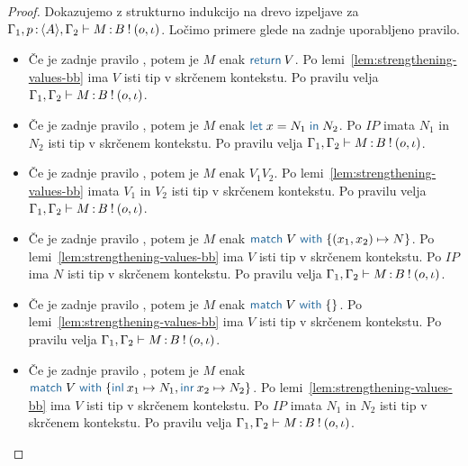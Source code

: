 \begin{proof}
	Dokazujemo z strukturno indukcijo na drevo izpeljave za $\Gamma_1, p \mathinner{:} \langle A \rangle, \Gamma_2 \vdash M \mathinner{:} B \mathbin{!} (o, \iota)$.
	Ločimo primere glede na zadnje uporabljeno pravilo.
	
	\begin{itemize}
		\item Če je zadnje pravilo , potem je $M$ enak $\tmreturn{V}$.
		Po lemi~\ref{lem:strengthening-values-bb} ima $V$ isti tip v skrčenem kontekstu.
		Po pravilu  velja $\Gamma_1, \Gamma_2 \vdash M \mathinner{:} B \mathbin{!} (o, \iota)$.
		
		\item Če je zadnje pravilo , potem je $M$ enak $\tmlet{x}{N_1}{N_2}$.
		Po $IP$ imata $N_1$ in $N_2$ isti tip v skrčenem kontekstu.
		Po pravilu  velja $\Gamma_1, \Gamma_2 \vdash M \mathinner{:} B \mathbin{!} (o, \iota)$.
		
		\item Če je zadnje pravilo , potem je $M$ enak $V_1 V_2$.
		Po lemi~\ref{lem:strengthening-values-bb} imata $V_1$ in $V_2$ isti tip v skrčenem kontekstu.
		Po pravilu  velja $\Gamma_1, \Gamma_2 \vdash M \mathinner{:} B \mathbin{!} (o, \iota)$.
		
		\item Če je zadnje pravilo , potem je $M$ enak $\tmmatch{V}{(x_1,x_2) \mapsto N}$. 
		Po lemi~\ref{lem:strengthening-values-bb} ima $V$ isti tip v skrčenem kontekstu.
		Po $IP$ ima $N$ isti tip v skrčenem kontekstu.
		Po pravilu  velja $\Gamma_1, \Gamma_2 \vdash M \mathinner{:} B \mathbin{!} (o, \iota)$.
		
		\item Če je zadnje pravilo , potem je $M$ enak $\tmmatch{V}{}$.
		Po lemi~\ref{lem:strengthening-values-bb} ima $V$ isti tip v skrčenem kontekstu.
		Po pravilu  velja $\Gamma_1, \Gamma_2 \vdash M \mathinner{:} B \mathbin{!} (o, \iota)$.
		
		\item Če je zadnje pravilo , potem je $M$ enak $\tmmatch{V}{\tminl{x_1} \mapsto N_1, \tminr{x_2} \mapsto N_2}$.
		Po lemi~\ref{lem:strengthening-values-bb} ima $V$ isti tip v skrčenem kontekstu.
		Po $IP$ imata $N_1$ in $N_2$ isti tip v skrčenem kontekstu.
		Po pravilu  velja $\Gamma_1, \Gamma_2 \vdash M \mathinner{:} B \mathbin{!} (o, \iota)$.
		

\end{itemize}
\end{proof}
